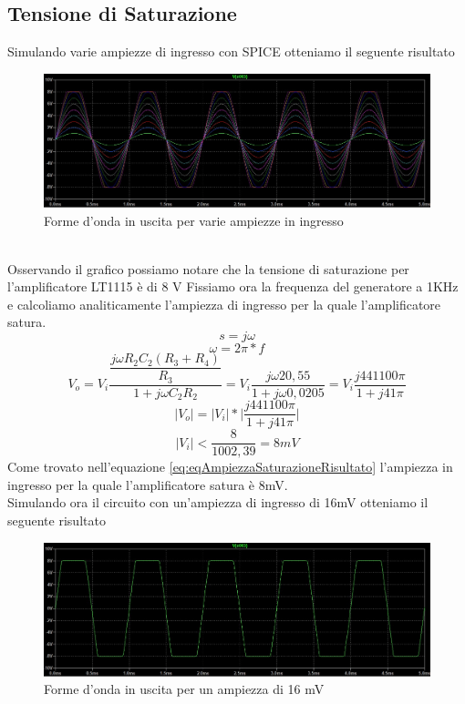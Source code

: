 \subsection{Tensione di Saturazione}\label{subsec:saturazione}
Simulando varie ampiezze di ingresso con SPICE otteniamo il seguente risultato\\
\begin{figure}[h]
    \centering
    \includegraphics[width=1\textwidth]{Figure/SaturazioneAnalisi 1.8.1.jpg}
    \caption{Forme d'onda in uscita per varie ampiezze in ingresso}
    \label{fig:saturazione_analisi}
\end{figure}\\
Osservando il grafico possiamo notare che la tensione di saturazione per l'amplificatore LT1115 è di 8 V
\newline
Fissiamo ora la frequenza del generatore a 1KHz e calcoliamo analiticamente l'ampiezza di ingresso per la quale l'amplificatore satura.\\
$$s = j\omega$$ $$\omega = 2\pi * f$$
\begin{equation}\label{eq:eqAmpiezzaSaturazione}
V_{o} = V_{i}\dfrac{\dfrac{j\omega R_{2}C_{2}(R_{3}+R_{4})}{R_{3}}}{1+j\omega C_{2}R_{2}} = V_{i}\dfrac{j\omega20,55}{1 + j\omega0,0205} = V_{i}\dfrac{j441100\pi}{1 + j41\pi}
\end{equation}
\begin{equation}\label{eq:eqAmpiezzaSaturazioneModuli}
|V_{o}| = |V_{i}| * \big| \dfrac{j441100\pi}{1 + j41\pi} \big|
\end{equation}
\begin{equation}\label{eq:eqAmpiezzaSaturazioneRisultato}
|V_{i}| < \dfrac{8}{1002,39} = 8 mV
\end{equation}
Come trovato nell'equazione \ref{eq:eqAmpiezzaSaturazioneRisultato} l'ampiezza in ingresso per la quale l'amplificatore satura è 8mV.\\
Simulando ora il circuito con un'ampiezza di ingresso di 16mV otteniamo il seguente risultato
\begin{figure}[h]
    \centering
    \includegraphics[width=1\textwidth]{Figure/SaturazioneUscita 1.8.2.jpg}
    \caption{Forme d'onda in uscita per un ampiezza di 16 mV}
    \label{fig:saturazione_uscita}
\end{figure}\\
